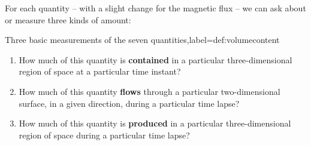 \documentclass[a4paper,12pt,%
onecolumn,oneside,%
british%
]{memoir}
\renewcommand*{\|}[1][]{\nonscript\:#1\vert\nonscript\:\mathopen{}}
\begin{document}
For each quantity -- with a slight change for the magnetic flux -- we can ask about or measure three kinds of amount:
\begin{definition}{Three basic measurements of the seven quantities,label={def:volumecontent}}
  \begin{enumerate}[label={M\arabic*}.,leftmargin=3em]
  \item\label{item:meas1}How much of this quantity is \textbf{contained} in a particular three-dimensional region of space at a particular time instant?

  \item\label{item:meas2a}How much of this quantity \textbf{flows} through a particular two-dimensional surface, in a given direction, during a particular time lapse?

  \item\label{item:meas3a}How much of this quantity is \textbf{produced} in a particular three-dimensional region of space during a particular time lapse?
  \end{enumerate}
\end{definition}
%
\end{document}
